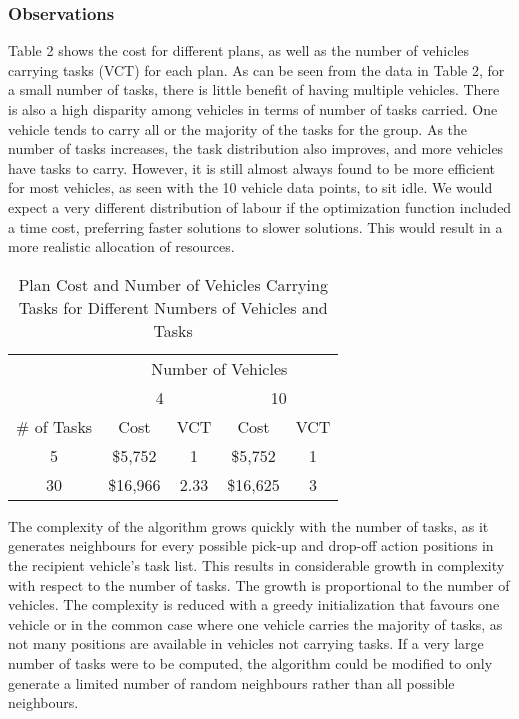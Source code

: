 \documentclass[11pt]{article}
\begin{document}
\subsubsection{Observations}
Table 2 shows the cost for different plans, as well as the number of vehicles carrying tasks (VCT) for each plan. As can be seen from the data in Table 2, for a small number of tasks, there is little benefit of having multiple vehicles. There is also a high disparity among vehicles in terms of number of tasks carried. One vehicle tends to carry all or the majority of the tasks for the group. As the number of tasks increases, the task distribution also improves, and more vehicles have tasks to carry. However, it is still almost always found to be more efficient for most vehicles, as seen with the 10 vehicle data points, to sit idle. We would expect a very different distribution of labour if the optimization function included a time cost, preferring faster solutions to slower solutions. This would result in a more realistic allocation of resources. 

\begin{table}[h]	
	\centering
	\caption{Plan Cost and Number of Vehicles Carrying Tasks for Different Numbers of Vehicles and Tasks}
	\begin{tabular}{c|c|c|c|c|}
		\cline{2-5}
		\multirow{2}{*}{} & \multicolumn{4}{c|}{Number of Vehicles} \\ \cline{2-5} 
		& \multicolumn{2}{c|}{4} & \multicolumn{2}{c|}{10} \\ \hline
		\multicolumn{1}{|c|}{\# of Tasks} & Cost & VCT & Cost & VCT \\ \hline
		\multicolumn{1}{|c|}{5} & \$5,752 & 1 & \$5,752 & 1 \\ \hline
		\multicolumn{1}{|c|}{30} & \$16,966 & 2.33 & \$16,625 & 3 \\ \hline
	\end{tabular}
\end{table}

The complexity of the algorithm grows quickly with the number of tasks, as it generates neighbours for every possible pick-up and drop-off action positions in the recipient vehicle's task list. This results in considerable growth in complexity with respect to the number of tasks. The growth is proportional to the number of vehicles. The complexity is reduced with a greedy initialization that favours one vehicle or in the common case where one vehicle carries the majority of tasks, as not many positions are available in vehicles not carrying tasks. If a very large number of tasks were to be computed, the algorithm could be modified to only generate a limited number of random neighbours rather than all possible neighbours. 
\end{document}
